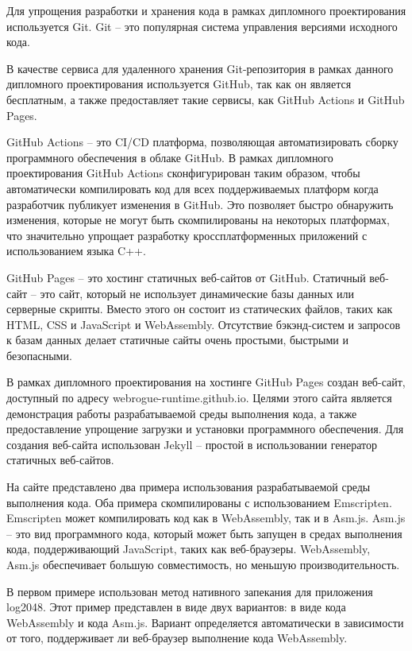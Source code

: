 Для упрощения разработки и хранения кода в рамках дипломного проектирования используется Git.
Git -- это популярная система управления версиями исходного кода.

В качестве сервиса для удаленного хранения Git-репозитория в рамках данного дипломного проектирования используется GitHub, так как он является бесплатным, а также предоставляет такие сервисы, как GitHub Actions и GitHub Pages.

GitHub Actions -- это CI/CD платформа, позволяющая автоматизировать сборку программного обеспечения в облаке GitHub.
В рамках дипломного проектирования GitHub Actions сконфигурирован таким образом, чтобы автоматически компилировать код для всех поддерживаемых платформ когда разработчик публикует изменения в GitHub.
Это позволяет быстро обнаружить изменения, которые не могут быть скомпилированы на некоторых платформах, что значительно упрощает разработку кроссплатформенных приложений с использованием языка C++.

GitHub Pages -- это хостинг статичных веб-сайтов от GitHub.
Статичный веб-сайт -- это сайт, который не использует динамические базы данных или серверные скрипты. 
Вместо этого он состоит из статических файлов, таких как HTML, CSS и JavaScript и WebAssembly.
Отсутствие бэкэнд-систем и запросов к базам данных делает статичные сайты очень простыми, быстрыми и безопасными.

В рамках дипломного проектирования на хостинге GitHub Pages создан веб-сайт, доступный по адресу webrogue-runtime.github.io.
Целями этого сайта является демонстрация работы разрабатываемой среды выполнения кода, а также предоставление упрощение загрузки и установки программного обеспечения.
Для создания веб-сайта использован Jekyll -- простой в использовании генератор статичных веб-сайтов.

На сайте представлено два примера использования разрабатываемой среды выполнения кода.
Оба примера скомпилированы с использованием Emscripten.
Emscripten может компилировать код как в WebAssembly, так и в Asm.js.
Asm.js -- это вид программного кода, который может быть запущен в средах выполнения кода, поддерживающий JavaScript, таких как веб-браузеры.
WebAssembly, Asm.js обеспечивает большую совместимость, но меньшую производительность.

В первом примере использован метод нативного запекания для приложения log2048.
Этот пример представлен в виде двух вариантов: в виде кода WebAssembly и кода Asm.js.
Вариант определяется автоматически в зависимости от того, поддерживает ли веб-браузер выполнение кода WebAssembly.

